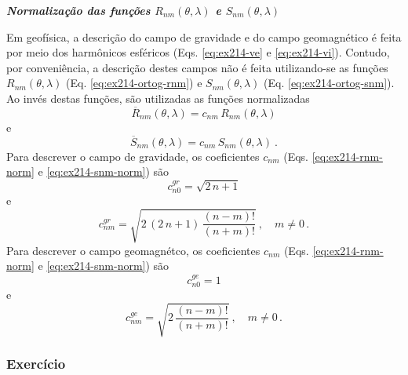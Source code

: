 \documentclass[10pt,a4paper,fleqn]{article}
\begin{document}
\begin{flushleft}
\emph{\textbf{Normalizaç\~{a}o das funç\~{o}es $R_{nm}(\theta, \lambda)$ e $S_{nm}(\theta, \lambda)$}}
\end{flushleft}

\bigskip
\bigskip

Em geof\'{i}sica, a descriç\~{a}o do campo de gravidade e do campo geomagn\'{e}tico \'{e} feita por
meio dos harm\^{o}nicos esf\'{e}ricos (Eqs. \ref{eq:ex214-ve} e \ref{eq:ex214-vi}). Contudo, por 
conveni\^{e}ncia, a descriç\~{a}o destes campos n\~{a}o \'{e} feita utilizando-se as funç\~{o}es 
$R_{nm}(\theta, \lambda)$ (Eq. \ref{eq:ex214-ortog-rnm}) e $S_{nm}(\theta, \lambda)$ 
(Eq. \ref{eq:ex214-ortog-snm}). Ao inv\'{e}s destas funç\~{o}es, s\~{a}o utilizadas as funç\~{o}es 
normalizadas
\begin{equation}
\overline{R}_{nm}(\theta,\lambda) = c_{nm} \, R_{nm}(\theta,\lambda)
\label{eq:ex214-rnm-norm}
\end{equation}
e
\begin{equation}
\overline{S}_{nm}(\theta,\lambda) = c_{nm} \, S_{nm}(\theta,\lambda) \: .
\label{eq:ex214-snm-norm}
\end{equation}
Para descrever o campo de gravidade, os coeficientes $c_{nm}$ 
(Eqs. \ref{eq:ex214-rnm-norm} e \ref{eq:ex214-snm-norm}) são 
\begin{equation}
c_{n0}^{gr} = \sqrt{2 \, n + 1}
\label{eq:ex214-cn0-grav}
\end{equation}
e
\begin{equation}
c_{nm}^{gr} = \sqrt{2 \, (2 \, n + 1) \, \dfrac{(n - m)!}{(n + m)!}} \: , \quad m \neq 0 \, .
\label{eq:ex214-cnm-grav}
\end{equation}
Para descrever o campo geomagn\'{e}tco, os coeficientes $c_{nm}$ 
(Eqs. \ref{eq:ex214-rnm-norm} e \ref{eq:ex214-snm-norm}) são 
\begin{equation}
c_{n0}^{ge} = 1
\label{eq:ex214-cn0-geom}
\end{equation}
e
\begin{equation}
c_{nm}^{ge} = \sqrt{2 \, \dfrac{(n - m)!}{(n + m)!}} \: , \quad m \neq 0 \, .
\label{eq:ex214-cnm-geom}
\end{equation}

\begin{flushleft}
\dotfill
\end{flushleft}

\subsubsection{Exerc\'{i}cio}
\end{document}
